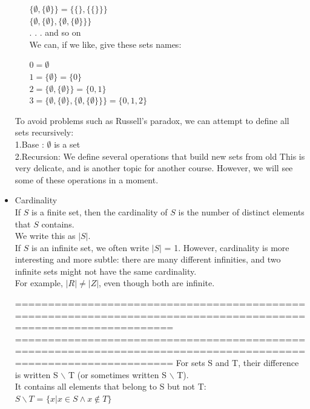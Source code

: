 \documentclass{article}
\begin{document}
\begin{itemize}
\begin{itemize}
$\{\emptyset, \{\emptyset\}\} = \{\{\}, \{\{\}\}\}$\\
$\{\emptyset, \{\emptyset\}, \{\emptyset, \{\emptyset\}\}\}$\\
. . . and so on\\

We can, if we like, give these sets names:

$0 = \emptyset$\\
$1 = \{\emptyset\} = \{0\}$\\
$2 = \{\emptyset, \{\emptyset\}\} = \{0, 1\}$\\
$3 = \{\emptyset, \{\emptyset\}, \{\emptyset, \{\emptyset\}\}\} = \{0, 1, 2\}$\\
\end{itemize}

To avoid problems such as Russell’s paradox, we can attempt to define all
sets recursively:\\
1.Base : $\emptyset$ is a set\\
2.Recursion: We define several operations that build new sets from old
This is very delicate, and is another topic for another course.
However, we will see some of these operations in a moment.\\


\item Cardinality\\
If $S$ is a finite set, then the cardinality of $S$ is the number of distinct
elements that $S$ contains.\\
We write this as $|S|$.\\
If $S$ is an infinite set, we often write $|S|$ = 1. However, cardinality is more
interesting and more subtle: there are many different infinities, and two
infinite sets might not have the same cardinality.\\
For example, $|R|  \neq |Z|$, even though both are infinite.

================================================================================================================
\newpage
================================================================================================================
For sets S and T, their difference is written S $\backslash$ T (or sometimes written S  $\backslash$ T).\\
It contains all elements that belong to S but not T:\\
$S \backslash T$ = $\{x | x \in S \land x \notin T\}$



\end{itemize}
\end{document}
